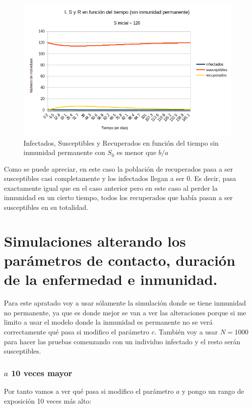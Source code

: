 \documentclass[11pt,a4paper]{report}
\begin{document}
\begin{figure}[H]
\centering
\includegraphics[width=\textwidth]{img/sin_inmunidad/simulacion_ba_menor.png}
\caption{Infectados, Susceptibles y Recuperados en función del tiempo sin inmunidad permanente con $S_0$ es menor que $b/a$}
\label{}
\end{figure}

Como se puede apreciar, en este caso la población de recuperados pasa a ser susceptibles casi completamente y los infectados llegan a ser 0. Es decir, pasa exactamente igual que en el caso anterior pero en este caso al perder la inmunidad en un cierto tiempo, todos los recuperados que había pasan a ser susceptibles en su totalidad.

\newpage
\section{Simulaciones alterando los parámetros de contacto, duración de la enfermedad e inmunidad.}

Para este apratado voy a usar sólamente la simulación donde se tiene inmunidad no permanente, ya que es donde mejor se van a ver las alteraciones porque si me limito a usar el modelo donde la inmunidad es permanente no se verá correctamente qué pasa si modifico el parámetro $c$. También voy a usar $N=1000$ para hacer las pruebas comenzando con un individuo infectado y el resto serán susceptibles.

\subsubsection{$a$ 10 veces mayor}

Por tanto vamos a ver qué pasa si modifico el parámetro $a$ y pongo un rango de exposición 10 veces más alto:
\end{document}
